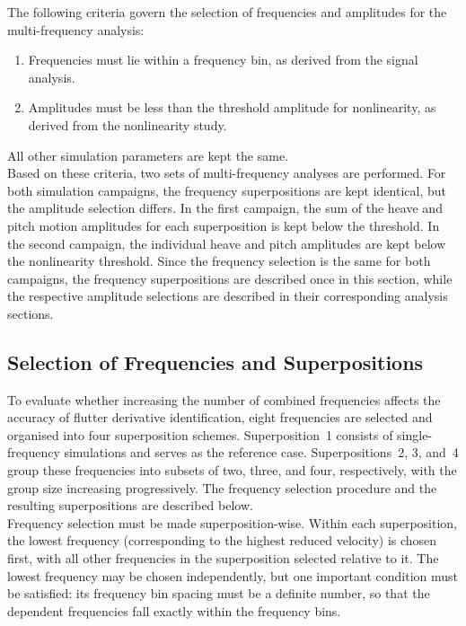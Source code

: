 \documentclass[../main]{subfiles}
\begin{document}
The following criteria govern the selection of frequencies and amplitudes for the 
multi-frequency analysis:

\begin{enumerate}
    \item Frequencies must lie within a frequency bin, as derived from the signal analysis.
    \item Amplitudes must be less than the threshold amplitude for nonlinearity, as derived from the nonlinearity study.
\end{enumerate}

All other simulation parameters are kept the same.\\

Based on these criteria, two sets of multi-frequency analyses are performed. For both simulation 
campaigns, the frequency superpositions are kept identical, but the amplitude selection differs. 
In the first campaign, the sum of the heave and pitch motion amplitudes for each 
superposition is kept below the threshold.
In the second campaign, the individual heave and pitch amplitudes are kept below the nonlinearity 
threshold. Since the frequency selection is the same for 
both campaigns, the frequency superpositions are described once in this section, while the 
respective amplitude selections are described in their corresponding analysis sections.

\subsection*{Selection of Frequencies and Superpositions}

To evaluate whether increasing the number of combined frequencies affects 
the accuracy of flutter derivative identification, eight frequencies are selected and 
organised into four superposition schemes. Superposition~1 consists of single-frequency 
simulations and serves as the reference case. Superpositions~2, 3, and~4 group these 
frequencies into subsets of two, three, and four, respectively, with the group size 
increasing progressively. The frequency selection procedure and the resulting superpositions 
are described below.\\

Frequency selection must be made superposition-wise. Within each superposition, 
the lowest frequency (corresponding to the highest reduced velocity) is 
chosen first, with all other frequencies in the superposition selected relative to it. The lowest frequency may be 
chosen independently, but one important condition must be satisfied: its frequency bin spacing 
must be a definite number, so that the dependent frequencies fall exactly within the frequency bins.\\
\end{document}
